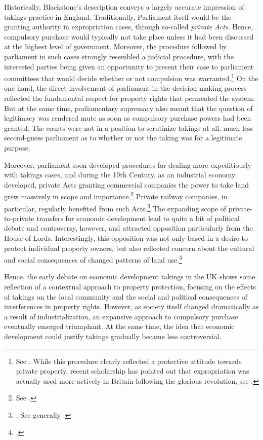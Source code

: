 Historically, Blackstone's description conveys a largely accurate impression of takings practice in England. Traditionally, Parliament itself would be the granting authority in expropriation cases, through so-called {\it private Acts}. Hence, compulsory purchase would typically not take place unless it had been discussed at the highest level of government. Moreover, the procedure followed by parliament in such cases strongly resembled a judicial procedure, with the interested parties being given an opportunity to present their case to parliament committees that would decide whether or not compulsion was warranted.\footnote{See \cite[13-16]{allen00}. While this procedure clearly reflected a protective attitude towards private property, recent scholarship has pointed out that expropriation was actually used more actively in Britain following the glorious revolution, see \cite{hoppit11}.} On the one hand, the direct involvement of parliament in the decision-making process reflected the fundamental respect for property rights that permeated the system. But at the same time, parliamentary supremacy also meant that the question of legitimacy was rendered mute as soon as compulsory purchase powers had been granted. The courts were not in a position to scrutinize takings at all, much less second-guess parliament as to whether or not the taking was for a legitimate purpose.

Moreover, parliament soon developed procedures for dealing more expeditiously with takings cases, and during the 19th Century, as an industrial economy developed, private Acts granting commercial companies the power to take land grew massively in scope and importance.\footnote{See \cite[204]{allen00}.} Private railway companies, in particular, regularly benefited from such Acts.\footnote{\cite[204]{allen00}. See generally \cite{kostal97}.} The expanding scope of private-to-private transfers for economic development lead to quite a bit of political debate and controversy, however, and attracted opposition particularly from the House of Lords. Interestingly, this opposition was not only based in a desire to protect individual property owners, but also reflected concern about the cultural and social consequences of changed patterns of land use.\footcite[204]{allen00} 

Hence, the early debate on economic development takings in the UK shows some reflection of a contextual approach to property protection, focusing on the effects of takings on the local community and the social and political consequences of interferences in property rights. However, as society itself changed dramatically as a result of industrialization, an expansive approach to compulsory purchase eventually emerged triumphant. At the same time, the idea that economic development could justify takings gradually became less controversial.

